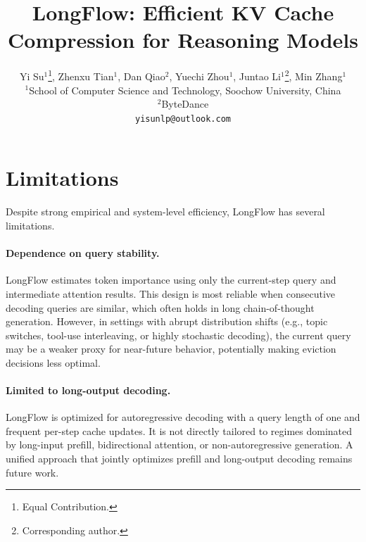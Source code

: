 \documentclass[11pt]{article}
\title{LongFlow: Efficient KV Cache Compression for Reasoning Models}
\author{Yi Su$^{1}$\thanks{\; Equal Contribution.}, Zhenxu Tian$^1$\footnotemark[1], Dan Qiao$^{2}$, Yuechi Zhou$^{1}$, Juntao Li$^{1}$\thanks{\; Corresponding author.}, Min Zhang$^{1}$ \\  
 $^{1}$School of Computer Science and Technology, Soochow University, China \\
 $^{2}$ByteDance \\
 \texttt{yisunlp@outlook.com}
 }
\begin{document}
\maketitle








\section*{Limitations}
Despite strong empirical and system-level efficiency, LongFlow has several limitations.

\paragraph{Dependence on query stability.}
LongFlow estimates token importance using only the current-step query and intermediate attention results. This design is most reliable when consecutive decoding queries are similar, which often holds in long chain-of-thought generation. However, in settings with abrupt distribution shifts (e.g., topic switches, tool-use interleaving, or highly stochastic decoding), the current query may be a weaker proxy for near-future behavior, potentially making eviction decisions less optimal.

\paragraph{Limited to long-output decoding.}
LongFlow is optimized for autoregressive decoding with a query length of one and frequent per-step cache updates. It is not directly tailored to regimes dominated by long-input prefill, bidirectional attention, or non-autoregressive generation. A unified approach that jointly optimizes prefill and long-output decoding remains future work.


%



\end{document}

